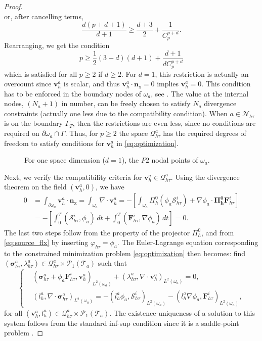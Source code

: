 \documentclass[10pt,a4paper]{amsart}
\def \Fhti {\bm{F}_\htt^i}
\def \Shti {\calS_\htt^i}
\def \calN {\mathcal{N}}
\def \calP {\mathcal{P}}
\def \calQ {\bm{\mathcal{Q}}}
\def \calS {\mathcal{S}}
\def \calT {\mathcal{T}}
\def \f  {\varphi}
\def \flxa {\bm{\sigma}^a_{\htt}}
\def \htt {{h\tau}}
\def \l  {\lambda}
\def \nhat {\bm{n}_{\mathrm{x}}}
\def \oma {\omega_a}
\def \p  {\partial}
\begin{document}
\begin{proof}
\[\]
or, after cancelling terms,
\[
\frac{d(p+d+1)}{d+1}\geq \frac{d+3}{2} + \frac{1}{C_p^{p+d}}.
\]
Rearranging, we get the condition \[p\geq \frac{1}{2}(3-d)(d+1) + \frac{d+1}{d C_p^{p+d}}\]
which is satisfied for all $p\geq 2$ if $d\geq 2$. For $d=1$, this restriction is actually an overcount since $\bm{v}_h^a$ is scalar, and thus $\bm{v}^a_h\cdot \nhat=0$ implies $\bm{v}_h^a=0$. This condition has to be enforced in the boundary nodes of $\oma$, see . The value at the internal nodes, $(N_a+1)$ in number, can be freely chosen to satisfy $N_a$ divergence constraints (actually one less due to the compatibility condition). When $a\in \calN_\htt$ is on the boundary $\Gamma_T$, then the restrictions are even less, since no conditions are required on $\p\oma \cap \Gamma$. Thus, for $p\geq 2$ the space $\calQ_\htt^a$  has the required degrees of freedom to satisfy conditions for $\bm{v}_h^a$ in \eqref{eq:optimization}.

    \begin{figure}[h]
                \centering
                    
                    \caption{For one space dimension ($d=1$), the  $P2$ nodal points of $\oma$.}
        \label{fig:P2nodes}
    \end{figure}



Next, we verify the compatibility criteria for $\bm{v}^a_h\in \calQ^a_\htt$. Using the divergence theorem on the field $(\bm{v}^a_h,0)$, we have
\begin{align*}
        0&=\int_{\p\oma} \bm{v}^a_h\cdot \nhat= \int_{\oma}  \nabla \cdot \bm{v}^a_h = - \left[\int_{\oma} \Pi_h^0 (\phi_a \Shti) + \nabla\phi_a \cdot \bm{\Pi_h^0} \Fhti\right]\\
        &= -\left[\int_0^T (\Shti, \phi_a ) \, dt
 + \int_0^T ( \Fhti, \nabla \phi_a ) \, dt\right]=0.
\end{align*}
The last two steps follow from the property of the projector $\Pi^0_h$, and from \eqref{eq:source_flx} by inserting $\f_\htt=\phi_a$. The Euler-Lagrange equation corresponding to the constrained minimization problem \eqref{eq:optimization} then becomes: find $(\flxa,\l^a_\htt)\in \calQ_\htt^a \times \calP_1(\calT_a)$ such that 
\begin{equation*}
    \left\{\begin{aligned}
        &(\flxa + \phi_a \Fhti, \bm{v}^a_h)_{L^2(\oma)} + (\l^a_\htt, \nabla \cdot \bm{v}^a_h)_{L^2(\oma)}= 0,\\
        &(l_h^a, \nabla \cdot \flxa)_{L^2(\oma)}= -(l_h^a\phi_a, \Shti)_{L^2(\oma)}- (l_h^a \nabla \phi_a, \Fhti)_{L^2(\oma)},
    \end{aligned}\right.  
\end{equation*}
for all $(\bm{v}^a_h,l_h^a)\in \calQ_\htt^a \times \calP_1(\calT_a)$. The existence-uniqueness of a solution to this system follows from the standard inf-sup condition since it is a saddle-point problem \cite[Chapter 4]{boffi2013mixed}.


\end{proof}
\end{document}
